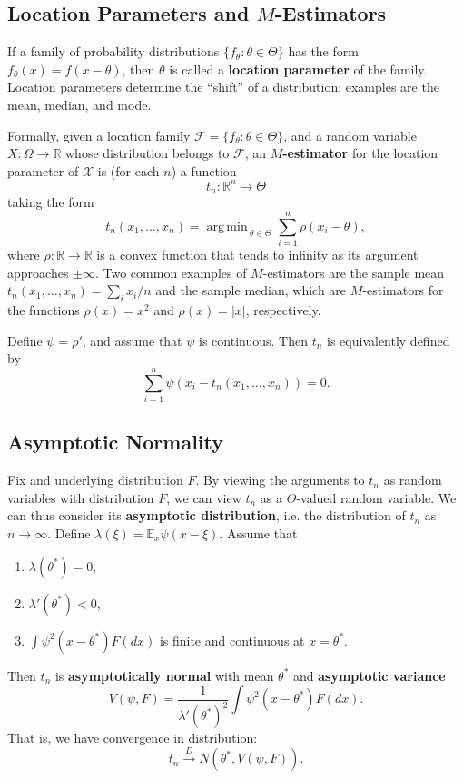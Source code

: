 \documentclass[reqno]{amsart}
\DeclareMathOperator*{\argmin}{arg\,min\,}
\numberwithin{equation}{section}
\begin{document}
\subsection{Location Parameters and $M$-Estimators}
If a family of probability distributions $\{ f_{\theta} : \theta \in \Theta\}$
has the form
$f_{\theta}(x) = f(x - \theta)$, then $\theta$ is called a \textbf{location parameter} of the family. Location parameters
determine the ``shift'' of a distribution; examples are the mean, median, and mode.

Formally, given a location family $\mathcal F = \{ f_{\theta} : \theta \in \Theta\}$, and a random variable
$X : \Omega \to \mathbb R$ whose distribution belongs to $\mathcal F$,
an \textbf{$M$-estimator} for the location parameter of $\mathcal X$ is (for each $n$) a function
$$
    t_n : \mathbb R^n \to \Theta
$$
taking the form
$$
    t_n(x_1, \ldots, x_n) = \argmin_{\theta \in \Theta} \sum_{i=1}^n \rho(x_i - \theta),
$$
where $\rho : \mathbb R \to \mathbb R$
is a convex function that tends to infinity as its argument approaches $\pm \infty$.
Two common examples of $M$-estimators are the sample mean
$t_n(x_1, \ldots, x_n) = \sum_i x_i /n$ and the sample median, which
are $M$-estimators for the functions $\rho(x) = x^2$ and $\rho(x) = |x|$, respectively.

Define $\psi = \rho'$, and assume that $\psi$ is continuous. Then $t_n$ is equivalently defined by
$$
    \sum_{i=1}^n \psi(x_i - t_n(x_1, \ldots, x_n)) = 0.
$$

\subsection{Asymptotic Normality}

Fix and underlying distribution $F$.
By viewing the arguments to $t_n$ as random variables with distribution $F$,
we can view $t_n$ as a $\Theta$-valued random variable.
We can thus consider its \textbf{asymptotic distribution}, i.e. the distribution of $t_n$ as $n \to \infty$.
Define $\lambda(\xi) = \mathbb E_x \psi(x - \xi)$. Assume that
\begin{enumerate}
    \item $\lambda(\theta^*) = 0$,
    \item $\lambda'(\theta^*) < 0$,
    \item $\int \psi^2(x - \theta^*) F(dx)$ is finite and continuous at $x = \theta^*$.
\end{enumerate}
Then $t_n$ is \textbf{asymptotically normal} with mean $\theta^*$ and \textbf{asymptotic variance}
$$
    V(\psi, F) = \frac{1}{\lambda'(\theta^*)^2} \int \psi^2(x - \theta^*) F(dx).
$$
That is, we have convergence in distribution:
$$
    t_n \xrightarrow{D} N(\theta^*, V(\psi, F)).
$$
\end{document}
